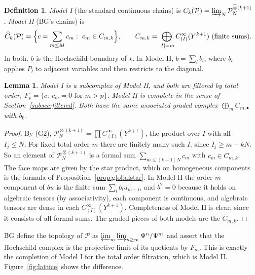 \documentclass[11pt,oneside,reqno]{article}
\newcommand{\cP}{\mathcal P}
\newcommand{\CI}{C^\infty}
\newcommand{\hot}{\mathbin{\widehat\otimes}}
\newcommand{\Chat}{\widehat C}
\theoremstyle{plain}
\newtheorem{lemma}[theorem]{Lemma}
\theoremstyle{definition}
\newtheorem{definition}[theorem]{Definition}
\theoremstyle{remark}
\begin{document}
\begin{definition}\label{def:models}
\emph{Model I} (the standard continuous chains) is
\(C_k(\cP)=\varinjlim_N\cP_N^{\hot(k+1)}\). \emph{Model II} (BG's chains) is
\[
 \Chat_k(\cP)=\Bigl\{c=\sum_{m\le M}c_m:\ c_m\in C_{m,k}\Bigr\},\qquad
 C_{m,k}=\bigoplus_{|I|=m}\CI_{(I)}(Y^{k+1})\ \text{(finite sums)}.
\]
In both, \(b\) is the Hochschild boundary of \(\star\). In Model II,
\(b=\sum_lb_l\), where \(b_l\) applies \(P_l\) to adjacent variables and then
restricts to the diagonal.
\end{definition}

\begin{lemma}\label{lem:models}
Model I is a subcomplex of Model II, and both are filtered by total order,
\(F_p=\{c:\ c_m=0\text{ for }m>p\}\). Model II is complete in the sense of
Section~\ref{subsec:filtered}. Both have the same associated graded complex
\(\bigoplus_mC_{m,\bullet}\) with \(b_0\).
\end{lemma}

\begin{proof}
By (G2), \(\cP_N^{\hot(k+1)}=\prod\CI_{(I)}(Y^{k+1})\), the product over \(I\) with all
\(I_j\le N\). For fixed total order \(m\) there are finitely many such \(I\), since
\(I_j\ge m-kN\). So an element of \(\cP_N^{\hot(k+1)}\) is a formal sum
\(\sum_{m\le(k+1)N}c_m\) with \(c_m\in C_{m,k}\). The face maps are given by the
star product, which on homogeneous components is the formula of
Proposition~\ref{prop:globalstar}. In Model II the order-\(m\) component of \(bu\)
is the finite sum \(\sum_lb_lu_{m+l}\), and \(b^2=0\) because it holds on algebraic
tensors (by associativity), each component is continuous, and algebraic
tensors are dense in each \(\CI_{(I)}(Y^{k+1})\). Completeness of Model II is
clear, since it consists of all formal sums. The graded pieces of both
models are the \(C_{m,k}\).
\end{proof}

BG define the topology of \(\cP\) as \(\varprojlim_m\varinjlim_{n\ge m}\Psi^n/\Psi^m\)
and assert \cite[\S4]{BG} that the Hochschild complex is the projective limit of
its quotients by \(F_m\). This is exactly the completion of Model I for the total
order filtration, which is Model II. Figure~\ref{fig:lattice} shows the
difference.
\end{document}

